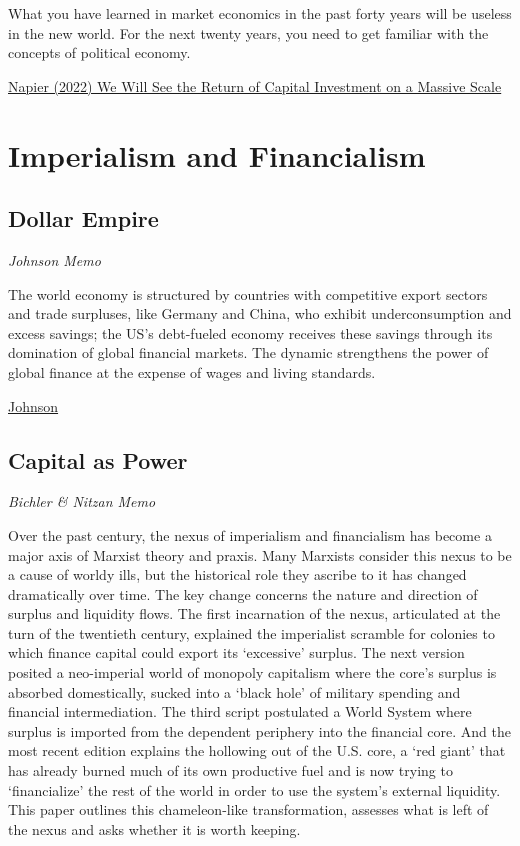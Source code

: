 \documentclass[
]{book}
\begin{document}
What you have learned in market economics in the past forty years will be useless in the new world. For the next twenty years, you need to get familiar with the concepts of political economy.

\href{https://themarket.ch/interview/russell-napier-the-world-will-experience-a-capex-boom-ld.7606}{Napier (2022) We Will See the Return of Capital Investment on a Massive Scale}

\hypertarget{imperialism-and-financialism-1}{%
\chapter{Imperialism and Financialism}\label{imperialism-and-financialism-1}}

\hypertarget{dollar-empire}{%
\section{Dollar Empire}\label{dollar-empire}}

\emph{Johnson Memo}

The world economy is structured by countries with competitive export sectors and trade surpluses, like Germany and China, who exhibit underconsumption and excess savings; the US's debt-fueled economy receives these savings through its domination of global financial markets. The dynamic strengthens the power of global finance at the expense of wages and living standards.

\href{https://phenomenalworld.org/analysis/reconstruction-finance}{Johnson}

\hypertarget{capital-as-power}{%
\section{Capital as Power}\label{capital-as-power}}

\emph{Bichler \& Nitzan Memo}

Over the past century, the nexus of imperialism and financialism has become a major axis
of Marxist theory and praxis. Many Marxists consider this nexus to be a cause of worldy
ills, but the historical role they ascribe to it has changed dramatically over time. The key
change concerns the nature and direction of surplus and liquidity flows. The first
incarnation of the nexus, articulated at the turn of the twentieth century, explained the
imperialist scramble for colonies to which finance capital could export its `excessive'
surplus. The next version posited a neo-imperial world of monopoly capitalism where the
core's surplus is absorbed domestically, sucked into a `black hole' of military spending
and financial intermediation. The third script postulated a World System where surplus is
imported from the dependent periphery into the financial core. And the most recent
edition explains the hollowing out of the U.S. core, a `red giant' that has already burned
much of its own productive fuel and is now trying to `financialize' the rest of the world in
order to use the system's external liquidity. This paper outlines this chameleon-like
transformation, assesses what is left of the nexus and asks whether it is worth keeping.
\end{document}
